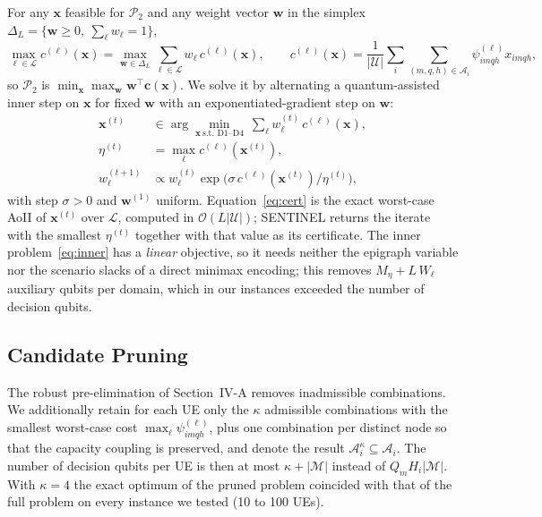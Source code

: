 For any $\mathbf{x}$ feasible for $\mathscr{P}_{2}$ and any weight vector $\mathbf{w}$ in the simplex
$\Delta_L=\{\mathbf{w}\geq 0,\ \sum_\ell w_\ell=1\}$,
\begin{equation}
    \max_{\ell\in\mathscr{L}} c^{(\ell)}(\mathbf{x})
    =\max_{\mathbf{w}\in\Delta_L}\sum_{\ell\in\mathscr{L}} w_\ell\, c^{(\ell)}(\mathbf{x}),
    \qquad c^{(\ell)}(\mathbf{x})=\frac{1}{|\mathscr{U}|}\sum_{i}\sum_{(m,q,h)\in\mathscr{A}_i}\psi^{(\ell)}_{imqh}x_{imqh},
    \label{eq:dual_max}
\end{equation}
so $\mathscr{P}_{2}$ is $\min_{\mathbf{x}}\max_{\mathbf{w}}\mathbf{w}^{\top}\mathbf{c}(\mathbf{x})$. We solve it by
alternating a quantum-assisted inner step on $\mathbf{x}$ for fixed $\mathbf{w}$ with an exponentiated-gradient step on
$\mathbf{w}$:
\begin{align}
    \mathbf{x}^{(t)} &\in \arg\min_{\mathbf{x}\ \text{s.t. D1--D4}}\ \sum_{\ell} w^{(t)}_\ell\, c^{(\ell)}(\mathbf{x}),
    \label{eq:inner}\\
    \eta^{(t)} &= \max_{\ell} c^{(\ell)}(\mathbf{x}^{(t)}),
    \label{eq:cert}\\
    w^{(t+1)}_\ell &\propto w^{(t)}_\ell \exp\!\bigl(\sigma\, c^{(\ell)}(\mathbf{x}^{(t)})/\eta^{(t)}\bigr),
    \label{eq:eg}
\end{align}
with step $\sigma>0$ and $\mathbf{w}^{(1)}$ uniform. Equation~\eqref{eq:cert} is the exact worst-case AoII of
$\mathbf{x}^{(t)}$ over $\mathscr{L}$, computed in $\mathcal{O}(L|\mathscr{U}|)$; SENTINEL returns the iterate with
the smallest $\eta^{(t)}$ together with that value as its certificate. The inner problem~\eqref{eq:inner} has a
\emph{linear} objective, so it needs neither the epigraph variable nor the scenario slacks of a direct minimax
encoding; this removes $M_\eta+L\,W_\ell$ auxiliary qubits per domain, which in our instances exceeded the number of
decision qubits.

\subsection{Candidate Pruning}

The robust pre-elimination of Section~IV-A removes inadmissible combinations. We additionally retain for each UE only
the $\kappa$ admissible combinations with the smallest worst-case cost $\max_\ell\psi^{(\ell)}_{imqh}$, plus one
combination per distinct node so that the capacity coupling is preserved, and denote the result
$\mathscr{A}^{\kappa}_i\subseteq\mathscr{A}_i$. The number of decision qubits per UE is then at most
$\kappa+|\mathscr{M}|$ instead of $Q_mH_i|\mathscr{M}|$. With $\kappa=4$ the exact optimum of the pruned problem
coincided with that of the full problem on every instance we tested (10 to 100 UEs).

